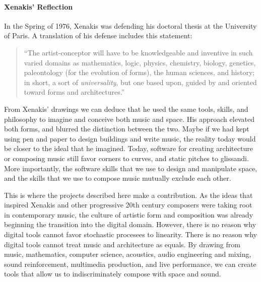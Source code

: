 \paragraph{Xenakis' Reflection} In the Spring of 1976, Xenakis was
defending his doctoral thesis at the University of Paris. A
translation of his defense includes this statement:
\begin{quotation}
  ``The artist-conceptor will have to be knowledgeable and inventive
  in such varied domains as mathematics, logic, physics, chemistry,
  biology, genetics, paleontology (for the evolution of forms), the
  human sciences, and history; in short, a sort of
  \emph{universality}, but one based upon, guided by and oriented
  toward forms and architectures.'' \cite{russolo1986art}
\end{quotation}
From Xenakis' drawings we can deduce that he used the same tools,
skills, and philosophy to imagine and conceive both music and
space. His approach elevated both forms, and blurred the distinction
between the two. Maybe if we had kept using pen and paper to design
buildings and write music, the reality today would be closer to the
ideal that he imagined. Today, software for creating architecture or
composing music still favor corners to curves, and static pitches to
glissandi. More importantly, the software skills that we use to design
and manipulate space, and the skills that we use to compose music
mutually exclude each other.

This is where the projects described here make a contribution. As the
ideas that inspired Xenakis and other progressive 20th century
composers were taking root in contemporary music, the culture of
artistic form and composition was already beginning the transition
into the digital domain. However, there is no reason why digital tools
cannot favor stochastic procesees to linearity. There is no reason why
digital tools cannot treat music and architecture as equals. By
drawing from music, mathematics, computer science, acoustics, audio
engineering and mixing, sound reinforcement, multimedia production,
and live performance, we can create tools that allow us to
indiscriminately compose with space and sound.

